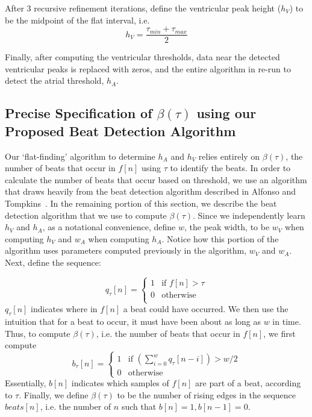 \documentclass[conference]{IEEEtran}
\newcommand{\APW}{\ensuremath{w_A}}
\newcommand{\VPW}{\ensuremath{w_V}}
\newcommand{\APH}{\ensuremath{h_A}}
\newcommand{\VPH}{\ensuremath{h_V}}
\begin{document}
After 3 recursive refinement iterations, define the ventricular peak height (\VPH{}) to be the midpoint of the flat interval, i.e.
\begin{equation*}
	\VPH{}=\frac{\tau_{min}+\tau_{max}}{2}
\end{equation*}

Finally, after computing the ventricular thresholds,
data near the detected ventricular peaks is replaced with
zeros, and the entire algorithm in re-run to detect the
atrial threshold, \APH{}.

\subsection{Precise Specification of $\beta(\tau)$ using our Proposed Beat Detection Algorithm}
Our `flat-finding' algorithm to determine \APH{} and
\VPH{} relies entirely on $\beta(\tau)$, 
the number of beats that occur in $f[n]$ using
$\tau$ to identify the beats. In order to calculate the
number of beats that occur based on threshold, we use
an algorithm that draws heavily from the beat
detection algorithm described in Alfonso and Tompkins~\cite{realtime-qrs}.
In the remaining portion of this section, we describe
the beat detection algorithm that we use to compute
$\beta(\tau)$.
Since we independently learn \VPH{} and \APH{}, as a notational convenience, define $w$, the peak width, to be \VPW{} when computing \VPH{} and \APW{} when computing \APH{}.
Notice how this portion of the algorithm uses parameters computed previously in the algorithm, \VPW{} and \APW{}.
Next, define the sequence:

\begin{equation*}
	q_{\tau}[n]=\left\{ 
		\begin{array}{lr}
			1 & \text{if } f[n] > \tau \\
			0 & \text{otherwise}\\
		\end{array}
		\right.
\end{equation*}
$q_{\tau}[n]$ indicates where in $f[n]$ a beat could
have occurred. We then use the intuition that for a beat
to occur, it must have been about as long as $w$ in time.
Thus, to compute $\beta(\tau)$, i.e. the number of
beats that occur in $f[n]$, we first compute
\begin{equation*}
	b_{\tau}[n]=\left\{ 
		\begin{array}{lc}
			1 & \text{if } \left(\sum_{i=0}^{w} q_{\tau}[n-i] \right) > w/2 \\
			0 & \text{otherwise}
		\end{array}
		\right.
\end{equation*}
Essentially, $b[n]$ indicates which samples of $f[n]$ are part of a beat, according to $\tau$.
Finally, we define $\beta(\tau)$ to be the number of rising edges in the sequence $beats[n]$, 
i.e. the number of $n$ such that $b[n] = 1, b[n-1] = 0$. %
\end{document}
